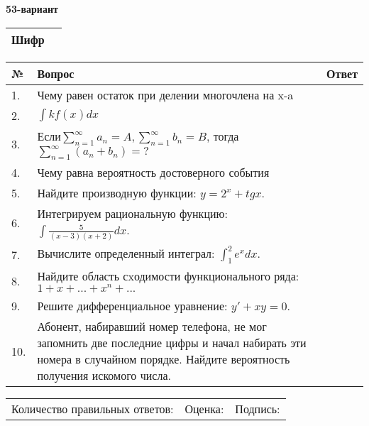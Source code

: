 \documentclass{article}
\begin{document}
  \egroup
  
  \newpage
  
  
  \textbf{53-вариант}\\
  
  \bgroup
  \def\arraystretch{1.6} %
  
  \begin{tabular}{|m{5.7cm}|m{9.5cm}|}
  \hline
  Шифр & \\
  \hline
  \end{tabular}
  
  \vspace{1cm}
  
  \begin{tabular}{|m{0.7cm}|m{10cm}|m{4cm}|}
  \hline
  № & Вопрос & Ответ \\
  \hline
  1. & Чему равен остаток при делении многочлена на x-a &  \\
  \hline
  2. & \(\int{kf(x)}dx\) &  \\
  \hline
  3. & Если\(\sum_{n = 1}^{\infty}a_{n} = A,\sum_{n = 1}^{\infty}b_{n} = B\), тогда \(\sum_{n = 1}^{\infty}\left( a_{n} + b_{n} \right) = ?\) &  \\
  \hline
  4. & Чему равна вероятность достоверного события &  \\
  \hline
  5. & Найдите производную функции: \(y = 2^{x} + tgx\). &  \\
  \hline
  6. & Интегрируем рациональную функцию: \(\int{\frac{5}{(x - 3)(x + 2)}dx}\). &  \\
  \hline
  7. & Вычислите определенный интеграл: \(\int_{1}^{2}{e^{x}dx}\). &  \\
  \hline
  8. & Найдите область сxодимости функционального ряда:\(1 + x + ... + x^{n} + ...\) &  \\
  \hline
  9. & Решите дифференциальное уравнение: \(y' + xy = 0\). &  \\
  \hline
  10. & Абонент, набиравший номер телефона, не мог запомнить две последние цифры и начал набирать эти номера в случайном порядке. Найдите вероятность получения искомого числа. &  \\
  \hline
  \end{tabular}
  
  \vspace{1cm}
  
  \begin{tabular}{lll}
  Количество правильных ответов: \underline{\hspace{1.5cm}} & 
  Оценка: \underline{\hspace{1.5cm}} & 
  Подпись: \underline{\hspace{2cm}} \\
  \end{tabular}
  
\end{document}
